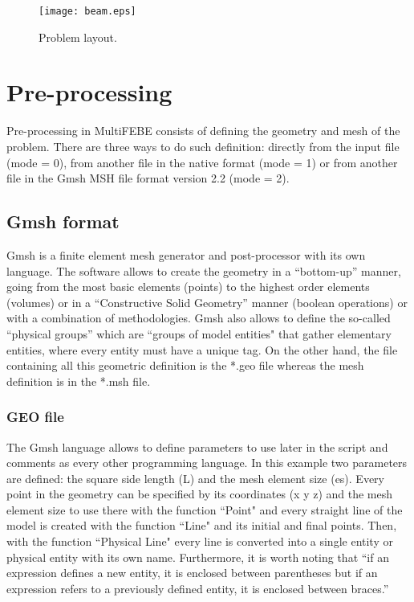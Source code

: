 \documentclass[a4]{article}
\begin{document}
\begin{figure}[h!]
	\centering
	\texttt{[image: beam.eps]}
	\caption{Problem layout.}
	\label{fig:beam}
\end{figure}

\section{Pre-processing} 

Pre-processing in MultiFEBE consists of defining the geometry and mesh of the problem. There are three ways to do such definition: directly from the input file (mode = 0), from another file in the native format (mode = 1) or from another file in the Gmsh MSH file format version 2.2 (mode = 2).

\subsection{Gmsh format}

Gmsh \cite{gmsh, gmshweb} is a finite element mesh generator and post-processor with its own language. The software allows to create the geometry in a “bottom-up” manner, going from the most basic elements (points) to the highest order elements (volumes) or in a “Constructive Solid Geometry” manner (boolean operations) or with a combination of methodologies. Gmsh also allows to define the so-called “physical groups” which are ``groups of model entities" that gather elementary entities, where every entity must have a unique tag. On the other hand, the file containing all this geometric definition is the *.geo file whereas the mesh definition is in the *.msh file. 

\subsubsection{GEO file}

The Gmsh language allows to define parameters to use later in the script and comments as every other programming language. In this example two parameters are defined: the square side length (L) and the mesh element size (es). Every point in the geometry can be specified by its coordinates (x y z) and the mesh element size to use there with the function ``Point" and every straight line of the model is created with the function ``Line" and its initial and final points. Then, with the function ``Physical Line" every line is converted into a single entity or physical entity with its own name. Furthermore, it is worth noting that “if an expression defines a new entity, it is enclosed between parentheses but if an expression refers to a previously defined entity, it is enclosed between braces.” \cite{gmshweb} 
\end{document}
